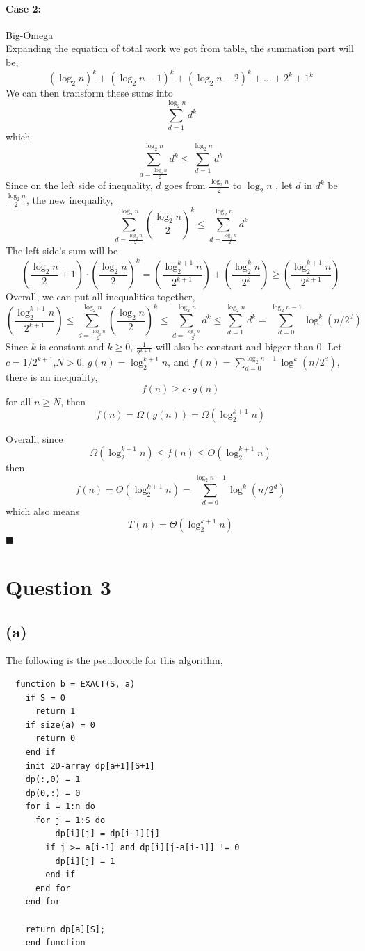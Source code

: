 \documentclass{article}
\begin{document}
\paragraph*{Case 2:} Big-Omega \\
Expanding the equation of total work we got from table, the summation part will be,
$$(\log_2 n )^k + (\log_2 n -1)^k + (\log_2 n -2)^k + \dots + 2^k + 1^k$$
We can then transform these sums into
$$\sum^{\log_2 n}_{d=1} d^k$$
which 
$$ \sum^{\log_2 n}_{d=\frac{\log_2 n}{2}} d^k \leq \sum^{\log_2 n}_{d=1} d^k$$
Since on the left side of inequality, $d$ goes from $\frac{\log_2 n}{2}$ to $\log_2 n$
, let $d$ in $d^k$ be $\frac{\log_2 n}{2}$, the new inequality,
$$\sum^{\log_2 n}_{d=\frac{\log_2 n}{2}} (\frac{\log_2 n}{2})^k \leq \sum^{\log_2 n}_{d=\frac{\log_2 n}{2}} d^k$$
The left side's sum will be 
$$(\frac{\log_2 n}{2} + 1) \cdot (\frac{\log_2 n}{2})^k = (\frac{\log^{k+1}_2 n}{2^{k+1}}) + (\frac{\log^k_2 n}{2^k}) \geq (\frac{\log^{k+1}_2 n}{2^{k+1}}) $$
Overall, we can put all inequalities together,
$$(\frac{\log^{k+1}_2 n}{2^{k+1}}) \leq \sum^{\log_2 n}_{d=\frac{\log_2 n}{2}} (\frac{\log_2 n}{2})^k \leq 
\sum^{\log_2 n}_{d=\frac{\log_2 n}{2}} d^k \leq \sum^{\log_2 n}_{d=1} d^k = \sum^{\log_2 n -1}_{d=0}\log^k (n/2^d)$$
Since $k$ is constant and $k \geq 0$, $\frac{1}{2^{k+1}}$ will also be constant and bigger than 0. Let $c = 1/2^{k+1}$,$N > 0$, $g(n) = \log^{k+1}_2 n$, 
and $f(n) = \sum^{\log_2 n -1}_{d=0}\log^k (n/2^d)$, there is an inequality,
$$f(n) \geq c \cdot g(n)$$
for all $n \geq N$, then
$$f(n)  = \Omega(g(n)) = \Omega(\log^{k+1}_2 n)$$

Overall, since 
$$\Omega(\log^{k+1}_2 n) \leq f(n) \leq O(\log^{k+1}_2 n)$$
then
$$f(n) = \Theta(\log^{k+1}_2 n) = \sum^{\log_2 n -1}_{d=0}\log^k (n/2^d)$$
which also means
$$T(n) =\Theta(\log^{k+1}_2 n)$$
$\blacksquare$


\section*{Question 3}
\subsection*{(a)}
The following is the pseudocode for this algorithm,
\begin{multicols}{2}
\begin{verbatim}
  function b = EXACT(S, a)
    if S = 0 
      return 1
    if size(a) = 0
      return 0
    end if
    init 2D-array dp[a+1][S+1]
    dp(:,0) = 1
    dp(0,:) = 0
    for i = 1:n do
      for j = 1:S do
          dp[i][j] = dp[i-1][j]
        if j >= a[i-1] and dp[i][j-a[i-1]] != 0
          dp[i][j] = 1
        end if
      end for
    end for

    return dp[a][S];
    end function
\end{verbatim}
\end{multicols}
\end{document}
